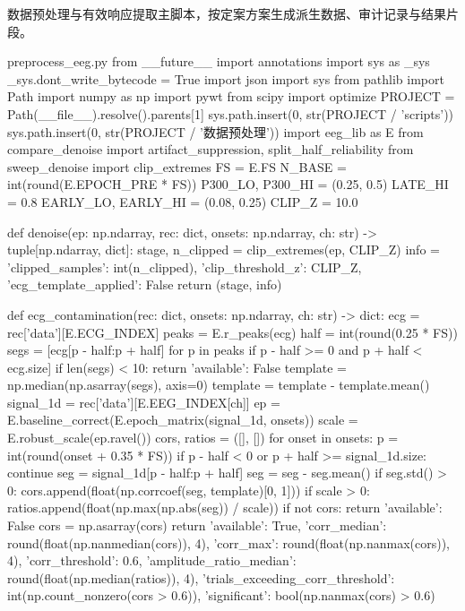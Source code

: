 \documentclass[bwprint]{gmcmthesis}
\begin{document}
\begin{appendices}

数据预处理与有效响应提取主脚本，按定案方案生成派生数据、审计记录与结果片段。

\begin{Python}{preprocess\_eeg.py}
from __future__ import annotations
import sys as _sys
_sys.dont_write_bytecode = True
import json
import sys
from pathlib import Path
import numpy as np
import pywt
from scipy import optimize
PROJECT = Path(__file__).resolve().parents[1]
sys.path.insert(0, str(PROJECT / 'scripts'))
sys.path.insert(0, str(PROJECT / '数据预处理'))
import eeg_lib as E
from compare_denoise import artifact_suppression, split_half_reliability
from sweep_denoise import clip_extremes
FS = E.FS
N_BASE = int(round(E.EPOCH_PRE * FS))
P300_LO, P300_HI = (0.25, 0.5)
LATE_HI = 0.8
EARLY_LO, EARLY_HI = (0.08, 0.25)
CLIP_Z = 10.0

def denoise(ep: np.ndarray, rec: dict, onsets: np.ndarray, ch: str) -> tuple[np.ndarray, dict]:
    stage, n_clipped = clip_extremes(ep, CLIP_Z)
    info = {'clipped_samples': int(n_clipped), 'clip_threshold_z': CLIP_Z, 'ecg_template_applied': False}
    return (stage, info)

def ecg_contamination(rec: dict, onsets: np.ndarray, ch: str) -> dict:
    ecg = rec['data'][E.ECG_INDEX]
    peaks = E.r_peaks(ecg)
    half = int(round(0.25 * FS))
    segs = [ecg[p - half:p + half] for p in peaks if p - half >= 0 and p + half < ecg.size]
    if len(segs) < 10:
        return {'available': False}
    template = np.median(np.asarray(segs), axis=0)
    template = template - template.mean()
    signal_1d = rec['data'][E.EEG_INDEX[ch]]
    ep = E.baseline_correct(E.epoch_matrix(signal_1d, onsets))
    scale = E.robust_scale(ep.ravel())
    cors, ratios = ([], [])
    for onset in onsets:
        p = int(round(onset + 0.35 * FS))
        if p - half < 0 or p + half >= signal_1d.size:
            continue
        seg = signal_1d[p - half:p + half]
        seg = seg - seg.mean()
        if seg.std() > 0:
            cors.append(float(np.corrcoef(seg, template)[0, 1]))
        if scale > 0:
            ratios.append(float(np.max(np.abs(seg)) / scale))
    if not cors:
        return {'available': False}
    cors = np.asarray(cors)
    return {'available': True, 'corr_median': round(float(np.nanmedian(cors)), 4), 'corr_max': round(float(np.nanmax(cors)), 4), 'corr_threshold': 0.6, 'amplitude_ratio_median': round(float(np.median(ratios)), 4), 'trials_exceeding_corr_threshold': int(np.count_nonzero(cors > 0.6)), 'significant': bool(np.nanmax(cors) > 0.6)}


\end{Python}
\end{appendices}
\end{document}
